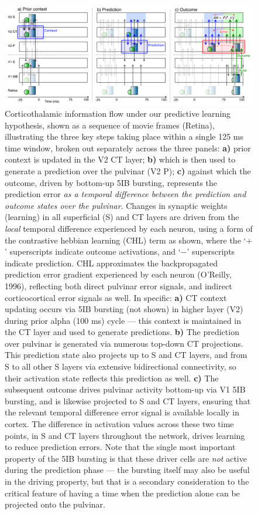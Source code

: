 \documentclass[11pt,twoside]{article}
\newif\myifpdf
\begin{document}
\begin{figure}
  \centering\includegraphics[width=6in]{fig_deepleabra_v1v2_time}
  \caption{\footnotesize Corticothalamic information flow under our predictive learning hypothesis, shown as a sequence of movie frames (Retina), illustrating the three key steps taking place within a single 125 ms time window, broken out separately across the three panels: {\bf a)} prior context is updated in the V2 CT layer; {\bf b)} which is then used to generate a prediction over the pulvinar (V2 P); {\bf c)} against which the outcome, driven by bottom-up 5IB bursting, represents the prediction error \emph{as a temporal difference between the prediction and outcome states over the pulvinar}. Changes in synaptic weights (learning) in all superficial (S) and CT layers are driven from the \emph{local} temporal difference experienced by each neuron, using a form of the contrastive hebbian learning (CHL) term as shown, where the `$+$' superscripts indicate outcome activations, and `$-$' superscripts indicate prediction. CHL approximates the backpropagated prediction error gradient experienced by each neuron (O'Reilly, 1996), reflecting both direct pulvinar error signals, and indirect corticocortical error signals as well.  In specific: {\bf a)} CT context updating occurs via 5IB bursting (not shown) in higher layer (V2) during prior alpha (100 ms) cycle --- this context is maintained in the CT layer and used to generate predictions. {\bf b)} The prediction over pulvinar is generated via numerous top-down CT projections. This prediction state also projects up to S and CT layers, and from S to all other S layers via extensive bidirectional connectivity, so their activation state reflects this prediction as well.  {\bf c)} The subsequent outcome drives pulvinar activity bottom-up via V1 5IB bursting, and is likewise projected to S and CT layers, ensuring that the relevant temporal difference error signal is available locally in cortex. The difference in activation values across these two time points, in S and CT layers throughout the network, drives learning to reduce prediction errors.  Note that the single most important property of the 5IB bursting is that these driver cells are \emph{not} active during the prediction phase --- the bursting itself may also be useful in the driving property, but that is a secondary consideration to the critical feature of having a time when the prediction alone can be projected onto the pulvinar.}
  \label{fig.dltime}
\end{figure}
\end{document}
